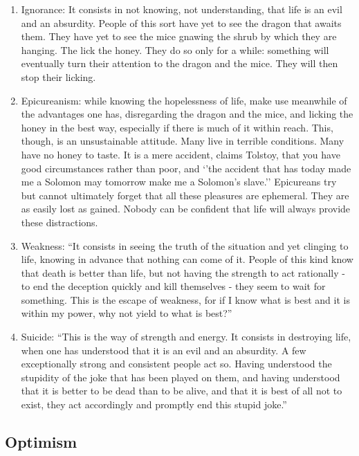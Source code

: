 \documentclass[]{article}
\begin{document}
\begin{enumerate}
\def\labelenumi{\arabic{enumi}.}
\item
  Ignorance: It consists in not knowing, not understanding, that life is
  an evil and an absurdity. People of this sort have yet to see the
  dragon that awaits them. They have yet to see the mice gnawing the
  shrub by which they are hanging. The lick the honey. They do so only
  for a while: something will eventually turn their attention to the
  dragon and the mice. They will then stop their licking.
\item
  Epicureanism: while knowing the hopelessness of life, make use
  meanwhile of the advantages one has, disregarding the dragon and the
  mice, and licking the honey in the best way, especially if there is
  much of it within reach. This, though, is an unsustainable attitude.
  Many live in terrible conditions. Many have no honey to taste. It is a
  mere accident, claims Tolstoy, that you have good circumstances rather
  than poor, and `'the accident that has today made me a Solomon may
  tomorrow make me a Solomon's slave.'' Epicureans try but cannot
  ultimately forget that all these pleasures are ephemeral. They are as
  easily lost as gained. Nobody can be confident that life will always
  provide these distractions.
\item
  Weakness: ``It consists in seeing the truth of the situation and yet
  clinging to life, knowing in advance that nothing can come of it.
  People of this kind know that death is better than life, but not
  having the strength to act rationally - to end the deception quickly
  and kill themselves - they seem to wait for something. This is the
  escape of weakness, for if I know what is best and it is within my
  power, why not yield to what is best?''
\item
  Suicide: ``This is the way of strength and energy. It consists in
  destroying life, when one has understood that it is an evil and an
  absurdity. A few exceptionally strong and consistent people act so.
  Having understood the stupidity of the joke that has been played on
  them, and having understood that it is better to be dead than to be
  alive, and that it is best of all not to exist, they act accordingly
  and promptly end this stupid joke.''
\end{enumerate}

\subsection{Optimism}\label{optimism}
\end{document}
